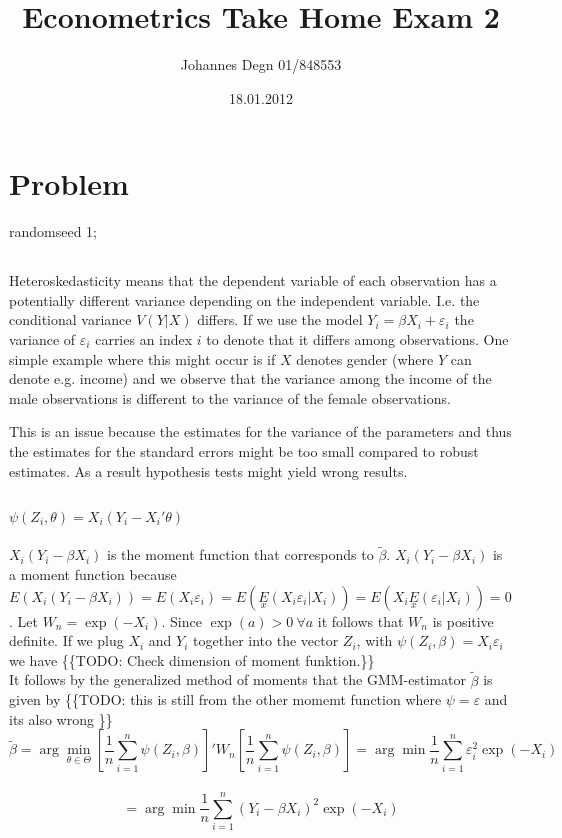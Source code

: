 \documentclass[11pt]{article}
\title{\textbf{Econometrics Take Home Exam 2}}
\author{Johannes Degn 01/848553}
\date{18.01.2012}
\theoremstyle{break}
\begin{document}
\maketitle


\section{Problem}
randomseed 1;

\subsection{}
Heteroskedasticity means that the dependent variable of each observation has a potentially different variance depending on the independent variable. I.e. the conditional variance $V(Y|X)$ differs. If we use the model $Y_i = \beta X_i + \varepsilon_i$ the variance of $\varepsilon_i$ carries an index $i$ to denote that it differs among observations. One simple example where this might occur is if $X$ denotes gender (where $Y$ can denote e.g. income) and we observe that the variance among the income of the male observations is different to the variance of the female observations.

This is an issue because the estimates for the variance of the parameters and thus the estimates for the standard errors might be too small compared to robust estimates. As a result hypothesis tests might yield wrong results.
\subsection{}
$\psi(Z_i, \theta) = X_i(Y_i - X_i'\theta)$ \\
\\
$X_i(Y_i - \beta X_i)$ is the moment function that corresponds to $\tilde{\beta}$. $X_i(Y_i - \beta X_i)$ is a moment function because $E(X_i(Y_i - \beta X_i)) = E(X_i\varepsilon_i) = E(\underset{x}{E}(X_i\varepsilon_i|X_i)) = E(X_i\underset{x}{E}(\varepsilon_i|X_i)) = 0$. Let $W_n = \exp(-X_i)$. Since $\exp(a) > 0 \ \forall a$ it follows that $W_n$ is positive definite. If we plug $X_i$ and $Y_i$ together into the vector $Z_i$, with $\psi(Z_i, \beta) = X_i\varepsilon_i$ we have \{\{TODO: Check dimension of moment funktion.\}\}
\\
It follows by the generalized method of moments that the GMM-estimator $\tilde{\beta}$ is given by \{\{TODO: this is still from the other momemt function where $\psi = \varepsilon$ and its also wrong \}\}
$$\tilde{\beta} = \displaystyle \arg \min_{\theta \in \Theta} [\frac{1}{n} \displaystyle \sum_{i=1}^n \psi(Z_i, \beta)]'W_n[\frac{1}{n} \displaystyle \sum_{i=1}^n \psi(Z_i, \beta)] = \arg \min \frac{1}{n} \displaystyle \sum_{i=1}^n \varepsilon_i^2\exp(-X_i)$$ \\$$= \arg \min \frac{1}{n} \displaystyle \sum_{i=1}^n (Y_i-\beta X_i)^2\exp(-X_i)$$
\end{document}

